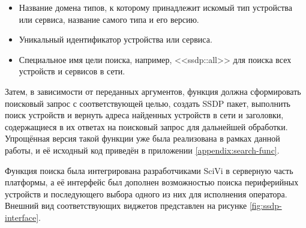 \begin{itemize}
	\item Название домена типов, к которому принадлежит искомый тип устройства или сервиса, название самого типа и его версию.
	\item Уникальный идентификатор устройства или сервиса.
	\item Специальное имя цели поиска, например, <<ssdp::all>> для поиска всех устройств и сервисов в сети.
\end{itemize}

Затем, в зависимости от переданных аргументов, функция должна сформировать поисковый запрос с соответствующей целью, создать SSDP пакет, выполнить поиск устройств и вернуть адреса найденных устройств в сети и заголовки, содержащиеся в их ответах на поисковый запрос для дальнейшей обработки.
Упрощённая версия такой функции уже была реализована в рамках данной работы, и её исходный код приведён в приложении \ref{appendix:search-func}.

Функция поиска была интегрирована разработчиками SciVi в серверную часть платформы, а её интерфейс был дополнен возможностью поиска периферийных устройств и последующего выбора одного из них для исполнения оператора.
Внешний вид соответствующих виджетов представлен на рисунке \ref{fig:ssdp-interface}.

